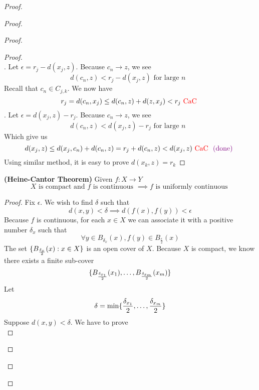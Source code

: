 \documentclass{report}
\begin{document}
\begin{proof}
\begin{proof}
\begin{proof}
\begin{proof}
\begin{equation*}
\end{equation*}
. Let $\epsilon =r_j -d(x_j,z)$. Because $c_n\to z$, we see 
\begin{equation*}
d(c_n,z)<r_j -d(x_j,z)\text{ for large $n$ }
\end{equation*}
Recall that $c_n\in C_{j,k}$. We now have
\begin{equation*}
r_j=d(c_n,x_j)\leq d(c_n,z)+d(z,x_j)<r_j\text{ \textcolor{red}{CaC} } 
\end{equation*}
. Let $\epsilon = d(x_j,z)-r_j $. Because $c_n \to z$, we see
\begin{equation*}
d(c_n,z)<d(x_j,z)-r_j \text{ for large $n$ }
\end{equation*}
Which give us
\begin{equation*}
  d(x_j,z)\leq d(x_j,c_n)+d(c_n,z)=r_j+d(c_n,z)<d(x_j,z)\text{ \textcolor{red}{CaC} }\textcolor{violet}{\text{ (done) }}
\end{equation*}
Using similar method, it is easy to prove $d(x_k,z)=r_k$
\end{proof}
\begin{theorem}
\label{5.2.6}
\textbf{(Heine-Cantor Theorem)} Given $f:X\rightarrow Y$
\begin{equation*}
X\text{ is compact and  }f\text{ is continuous }\implies f\text{ is uniformly continuous }
\end{equation*}
\end{theorem}
\begin{proof}
Fix $\epsilon $. We wish to find $\delta$ such that 
\begin{equation*}
d(x,y)<\delta \implies d(f(x),f(y))<\epsilon 
\end{equation*}
Because $f$ is continuous, for each $x\in X$ we can associate it with a positive number $\delta_x$ such that 
\begin{equation*}
\forall y\in B_{\delta_x}(x), f(y) \in B_{\frac{\epsilon}{2}}(x)
\end{equation*}
The set $\{ B_{\frac{\delta_x}{2}}(x):x\in X \}$ is an open cover of $X$. Because  $X$ is compact, we know there exists a finite sub-cover
\begin{equation*}
\{ B_{\frac{\delta_{x_1}}{2}}(x_1),\dots ,B_{\frac{\delta_{x_m}}{2}}(x_m) \}
\end{equation*}
Let 
\begin{equation*}
\delta=\min \{ \frac{\delta_{x_1}}{2},\dots , \frac{\delta_{x_m}}{2} \}
\end{equation*}
Suppose $d(x,y)<\delta$. We have to prove
\begin{equation*}

\end{equation*}
\end{proof}
\end{proof}
\end{proof}
\end{proof}
\end{document}
